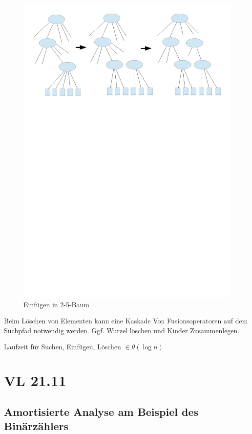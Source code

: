 \documentclass[a4paper,twoside,10pt]{report}
\begin{document}
\begin{figure}[H]
\includegraphics[trim= 1cm 20cm 1cm 1cm,clip,width=\columnwidth]{figures/25bauminsert.pdf}
\caption{Einfügen in 2-5-Baum}
\end{figure}

Beim Löschen von Elementen kann eine Kaskade Von Fusionsoperatoren auf dem Suchpfad notwendig werden. Ggf. Wurzel löschen und Kinder Zusammenlegen.

Laufzeit für Suchen, Einfügen, Löschen $\in \theta(\log n)$

\chapter{VL 21.11}
\section{Amortisierte Analyse am Beispiel des Binärzählers}
\end{document}
